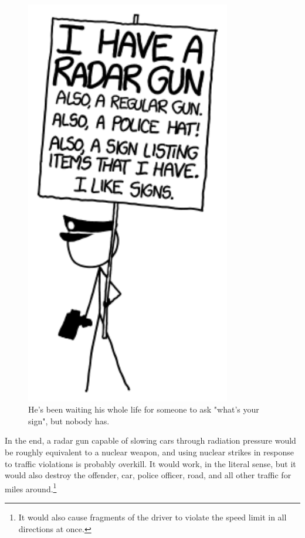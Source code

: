 {\begin{figure}[!htbp]
\centering
\includegraphics[scale=0.5, max width=0.8\textwidth]{imgs/a/87/radar_gun.png}
\caption{He's been waiting his whole life for someone to ask "what's your sign", but nobody has.}
\end{figure}

{In the end, a radar gun capable of slowing cars through radiation pressure would be roughly equivalent to a nuclear weapon, and using nuclear strikes in response to traffic violations is probably overkill. It would work, in the literal sense, but it would also destroy the offender, car, police officer, road, and all other traffic for miles around.{\footnote{It would also cause fragments of the driver to violate the speed limit in all directions at once.} } }

}
